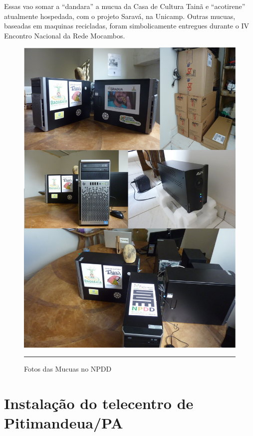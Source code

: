 \documentclass[a4paper, 11pt, oneside]{Relatorio_sem}  %
\begin{document}
Essas vao somar a ``dandara'' a mucua da Casa de Cultura Tainã e
``acotirene'' atualmente hospedada, com o projeto Saravá, na
Unicamp. Outras mucuas, baseadas em maquinas recicladas, foram
simbolicamente entregues durante o IV Encontro Nacional da Rede
Mocambos.

\begin{figure}[htbp]
  \centering
  \includegraphics[width=\textwidth]{./Fig/Fotos_Mucuas.pdf}
  \rule{35em}{0.5pt}
  \caption[Fotos das Mucuas no NPDD]{Fotos das Mucuas no NPDD}
  \label{fig:Mucuas}
\end{figure}






\section{Instalação do telecentro de Pitimandeua/PA}
\end{document}
